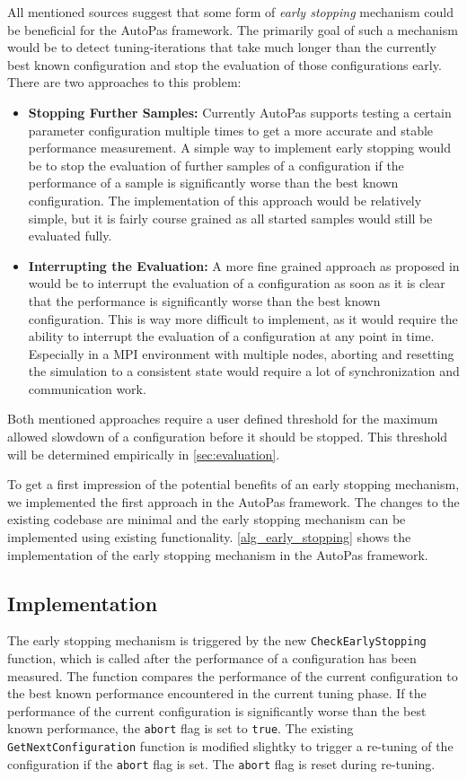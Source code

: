 \documentclass[conference]{IEEEtran}
\begin{document}
All mentioned sources suggest that some form of \textit{early stopping} mechanism could be beneficial for the AutoPas framework. The primarily goal of such a mechanism would be to detect tuning-iterations that take much longer than the currently best known configuration and stop the evaluation of those configurations early. There are two approaches to this problem:

\begin{itemize}
    \item \textbf{Stopping Further Samples:} Currently AutoPas supports testing a certain parameter configuration multiple times to get a more accurate and stable performance measurement. A simple way to implement early stopping would be to stop the evaluation of further samples of a configuration if the performance of a sample is significantly worse than the best known configuration. The implementation of this approach would be relatively simple, but it is fairly course grained as all started samples would still be evaluated fully.
    \item \textbf{Interrupting the Evaluation:} A more fine grained approach as proposed in \cite{endreport.pdf} would be to interrupt the evaluation of a configuration as soon as it is clear that the performance is significantly worse than the best known configuration. This is way more difficult to implement, as it would require the ability to interrupt the evaluation of a configuration at any point in time. Especially in a MPI environment with multiple nodes, aborting and resetting the simulation to a consistent state would require a lot of synchronization and communication work.
\end{itemize}

Both mentioned approaches require a user defined threshold for the maximum allowed slowdown of a configuration before it should be stopped. This threshold will be determined empirically in \autoref{sec:evaluation}.

To get a first impression of the potential benefits of an early stopping mechanism, we implemented the first approach in the AutoPas framework. The changes to the existing codebase are minimal and the early stopping mechanism can be implemented using existing functionality. \autoref{alg_early_stopping} shows the implementation of the early stopping mechanism in the AutoPas framework.

\subsection{Implementation}
The early stopping mechanism is triggered by the new \texttt{CheckEarlyStopping} function, which is called after the performance of a configuration has been measured. The function compares the performance of the current configuration to the best known performance encountered in the current tuning phase. If the performance of the current configuration is significantly worse than the best known performance, the \texttt{abort} flag is set to \texttt{true}. The existing \texttt{GetNextConfiguration} function is modified slightky to trigger a re-tuning of the configuration if the \texttt{abort} flag is set. The \texttt{abort} flag is reset during re-tuning.
\end{document}
